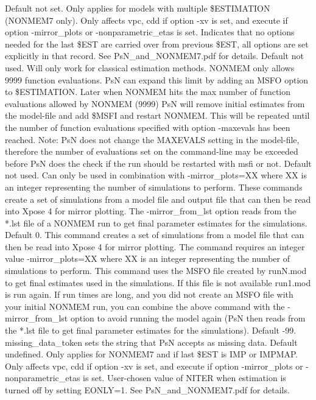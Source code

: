 \begin{optionlist}
\nextopt
{}
Default not set. Only applies for models with multiple \$ESTIMATION (NONMEM7 only). Only affects vpc,  cdd if option -xv is set, and execute if option -mirror\_plots or -nonparametric\_etas is set. Indicates that no options needed for the last \$EST are carried over from previous \$EST, all options are set explicitly in that record. See PsN\_and\_NONMEM7.pdf for details. 
\nextopt
{}
Default not used. Will only work for classical estimation methods. NONMEM only allows 9999 function evaluations. PsN can expand this limit by adding an MSFO option to \$ESTIMATION. Later when NONMEM hits the max number of function evaluations allowed by NONMEM (9999) PsN will remove initial estimates from the model-file and add \$MSFI and restart NONMEM. This will be repeated until the number of function evaluations specified with option -maxevals has been reached. Note: PsN does not change the MAXEVALS setting in the model-file, therefore the number of evaluations set on the command-line may be exceeded before PsN does the check if the run should be restarted with msfi or not. 
\nextopt
{}
Default not used. Can only be used in combination with -mirror\_plots=XX where XX is an integer representing the number of simulations to perform.  These commands create a set of simulations from a model file and output file that can then be read into Xpose 4 for mirror plotting.  The -mirror\_from\_lst option reads from the *.lst file of a NONMEM run to get final parameter estimates for the simulations. 
\nextopt
{}
Default 0. This command creates a set of simulations from a model file that can then be read into Xpose 4 for mirror plotting. The command requires an integer value -mirror\_plots=XX where XX is an integer representing the number of simulations to perform. This command uses the MSFO file created by runN.mod to get final estimates used in the simulations. If this file is not available run1.mod is run again.  If run times are long, and you did not create an MSFO file with your initial NONMEM run, you can combine the above command with the -mirror\_from\_lst option to avoid running the model again (PsN then reads from the *.lst file to get final parameter estimates for the simulations). 
\nextopt
{}
Default -99. missing\_data\_token sets the string that PsN accepts as missing data. 
\nextopt
{}
Default undefined. Only applies for NONMEM7 and if last \$EST is IMP or IMPMAP. Only affects vpc,  cdd if option -xv is set, and execute if option -mirror\_plots or -nonparametric\_etas is set. User-chosen value of NITER when estimation is turned off by setting EONLY=1. See PsN\_and\_NONMEM7.pdf for details. 

\end{optionlist}

